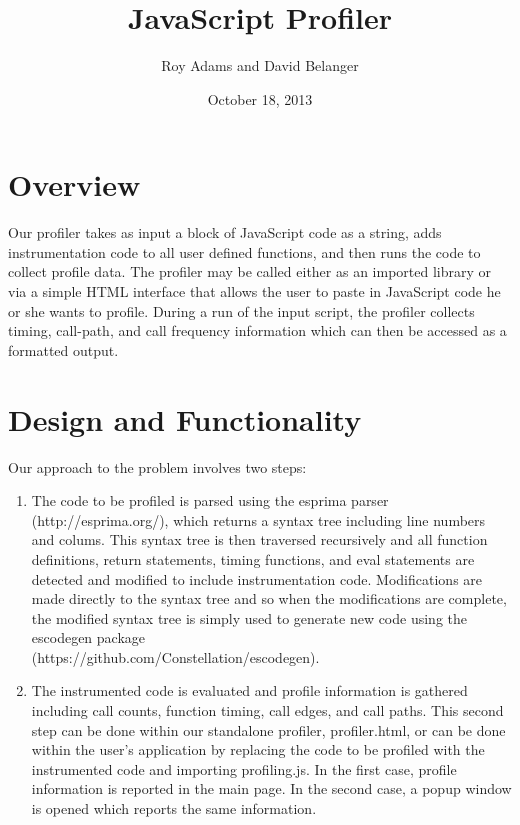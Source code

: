 \documentclass[11pt]{article}
\begin{document}
\newenvironment{myindentpar}[1]%
{\begin{list}{}%
         {\setlength{\leftmargin}{#1}}%
         \item[]%
}
{\end{list}}

\title{JavaScript Profiler}
\date{October 18, 2013}
\author{Roy Adams and David Belanger}

\maketitle

\section{Overview}

	Our profiler takes as input a block of JavaScript code as a string, adds instrumentation code 
to all user defined functions, and then runs the code to collect profile data. The profiler may 
be called either as an imported library or via a simple HTML interface that allows the user to 
paste in JavaScript code he or she wants to profile. During a run of the input script, the profiler 
collects timing, call-path, and call frequency information which can then be accessed as a formatted output. 

\section{Design and Functionality}
	
Our approach to the problem involves two steps:
\begin{enumerate}
\item  The code to be profiled is parsed using the 
esprima parser (http://esprima.org/), which returns a syntax tree including line numbers and colums. This 
syntax tree is then traversed recursively and all function definitions, return statements, timing 
functions, and eval statements are detected and modified to include instrumentation code. Modifications 
are made directly to the syntax tree and so when the modifications are complete, the modified syntax 
tree is simply used to generate new code using the escodegen package \\(https://github.com/Constellation/escodegen).
\item The instrumented code is evaluated and profile information is gathered including call counts, function timing, call edges, and call paths. This second step can be done within our standalone profiler, 
profiler.html, or can be done within the user's application by replacing the code to be profiled 
with the instrumented code and importing profiling.js. In the first case, profile information is 
reported in the main page. In the second case, a popup window is opened which reports the same information.
\end{enumerate}
\end{document}
